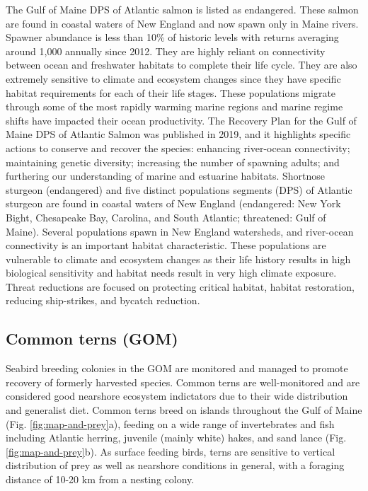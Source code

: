 \documentclass[10pt,]{article}
\begin{document}
The Gulf of Maine DPS of Atlantic salmon is listed as endangered. These
salmon are found in coastal waters of New England and now spawn only in
Maine rivers. Spawner abundance is less than 10\% of historic levels
with returns averaging around 1,000 annually since 2012. They are highly
reliant on connectivity between ocean and freshwater habitats to
complete their life cycle. They are also extremely sensitive to climate
and ecosystem changes since they have specific habitat requirements for
each of their life stages. These populations migrate through some of the
most rapidly warming marine regions and marine regime shifts have
impacted their ocean productivity. The Recovery Plan for the Gulf of
Maine DPS of Atlantic Salmon was published in 2019, and it highlights
specific actions to conserve and recover the species: enhancing
river-ocean connectivity; maintaining genetic diversity; increasing the
number of spawning adults; and furthering our understanding of marine
and estuarine habitats. Shortnose sturgeon (endangered) and five
distinct populations segments (DPS) of Atlantic sturgeon are found in
coastal waters of New England (endangered: New York Bight, Chesapeake
Bay, Carolina, and South Atlantic; threatened: Gulf of Maine). Several
populations spawn in New England watersheds, and river-ocean
connectivity is an important habitat characteristic. These populations
are vulnerable to climate and ecosystem changes as their life history
results in high biological sensitivity and habitat needs result in very
high climate exposure. Threat reductions are focused on protecting
critical habitat, habitat restoration, reducing ship-strikes, and
bycatch reduction.

\subsection{Common terns (GOM)}\label{common-terns-gom}

Seabird breeding colonies in the GOM are monitored and managed to
promote recovery of formerly harvested species. Common terns are
well-monitored and are considered good nearshore ecosystem indictators
due to their wide distribution and generalist diet. Common terns breed
on islands throughout the Gulf of Maine (Fig. \ref{fig:map-and-prey}a),
feeding on a wide range of invertebrates and fish including Atlantic
herring, juvenile (mainly white) hakes, and sand lance (Fig.
\ref{fig:map-and-prey}b). As surface feeding birds, terns are sensitive
to vertical distribution of prey as well as nearshore conditions in
general, with a foraging distance of 10-20 km from a nesting colony.
\end{document}
